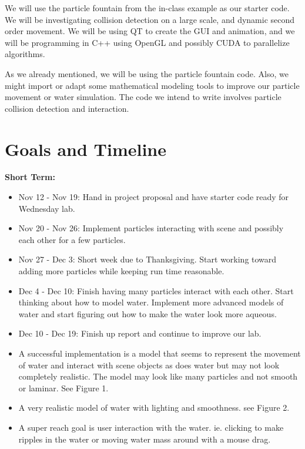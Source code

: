 \documentclass[dvips,12pt]{article}
\begin{document}
We will use the particle fountain from the in-class example as our starter code. We will
be investigating collision detection on a large scale, and dynamic second order movement.
We will be using QT to create the GUI and animation, and we will be programming in C++ 
using OpenGL and possibly CUDA to parallelize algorithms. 

As we already mentioned, we will be using the particle fountain code. Also, we might 
import or adapt some mathematical modeling tools to improve our particle movement or
water simulation. The code we intend to write involves particle collision detection
and interaction. 
\newpage

\section{Goals and Timeline}

\textbf{Short Term:}
\begin{itemize}
  \item Nov 12 - Nov 19: Hand in project proposal and have starter code ready for Wednesday lab.
  \item Nov 20 - Nov 26: Implement particles interacting with scene and possibly each other for
  a few particles.
  \item Nov 27 - Dec 3: Short week due to Thanksgiving. Start working toward adding more
  particles while keeping run time reasonable.
  \item Dec 4 - Dec 10: Finish having many particles interact with each other. Start thinking about
  how to model water. Implement more advanced models of water and start figuring out how to make
  the water look more aqueous.
  \item Dec 10 - Dec 19: Finish up report and continue to improve our lab.
\end{itemize}

\begin{itemize}
  \item A successful implementation is a model that seems to represent the movement of water and interact with scene objects as does water but may not look completely realistic. The model may look like many particles and not smooth or laminar. See Figure 1.
\end{itemize}

\begin{itemize}
  \item A very realistic model of water with lighting and smoothness. see Figure 2.
  \item A super reach goal is user interaction with the water. ie. clicking to make 
  ripples in the water or moving water mass around with a mouse drag.
\end{itemize}
\end{document}
